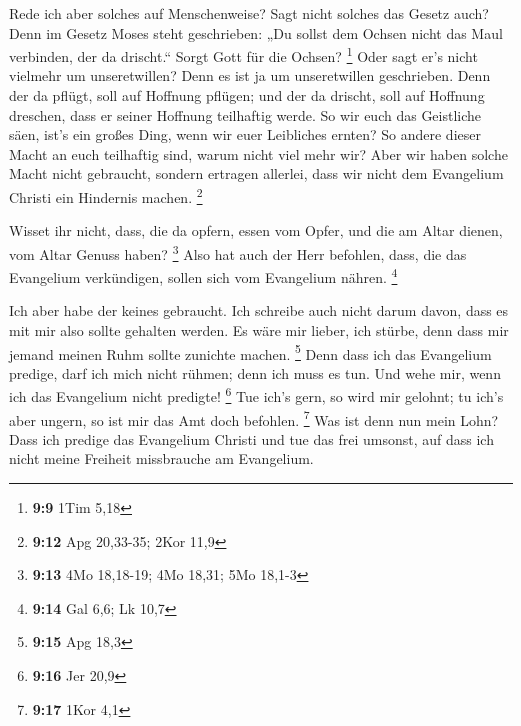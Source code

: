  Rede ich aber solches auf Menschenweise? Sagt nicht solches
das Gesetz auch?  Denn im Gesetz Moses steht geschrieben:
„Du sollst dem Ochsen nicht das Maul verbinden, der da drischt.`` Sorgt
Gott für die Ochsen? \footnote{\textbf{9:9} 1Tim 5,18} 
Oder sagt er's nicht vielmehr um unseretwillen? Denn es ist ja um
unseretwillen geschrieben. Denn der da pflügt, soll auf Hoffnung
pflügen; und der da drischt, soll auf Hoffnung dreschen, dass er seiner
Hoffnung teilhaftig werde.  So wir euch das Geistliche
säen, ist's ein großes Ding, wenn wir euer Leibliches ernten?
 So andere dieser Macht an euch teilhaftig sind, warum
nicht viel mehr wir? Aber wir haben solche Macht nicht gebraucht,
sondern ertragen allerlei, dass wir nicht dem Evangelium Christi ein
Hindernis machen. \footnote{\textbf{9:12} Apg 20,33-35; 2Kor 11,9}

 Wisset ihr nicht, dass, die da opfern, essen vom Opfer,
und die am Altar dienen, vom Altar Genuss haben? \footnote{\textbf{9:13}
  4Mo 18,18-19; 4Mo 18,31; 5Mo 18,1-3}  Also hat auch der
Herr befohlen, dass, die das Evangelium verkündigen, sollen sich vom
Evangelium nähren. \footnote{\textbf{9:14} Gal 6,6; Lk 10,7}

 Ich aber habe der keines gebraucht. Ich schreibe auch
nicht darum davon, dass es mit mir also sollte gehalten werden. Es wäre
mir lieber, ich stürbe, denn dass mir jemand meinen Ruhm sollte zunichte
machen. \footnote{\textbf{9:15} Apg 18,3}  Denn dass ich
das Evangelium predige, darf ich mich nicht rühmen; denn ich muss es
tun. Und wehe mir, wenn ich das Evangelium nicht predigte! \footnote{\textbf{9:16}
  Jer 20,9}  Tue ich's gern, so wird mir gelohnt; tu ich's
aber ungern, so ist mir das Amt doch befohlen. \footnote{\textbf{9:17}
  1Kor 4,1}  Was ist denn nun mein Lohn? Dass ich predige
das Evangelium Christi und tue das frei umsonst, auf dass ich nicht
meine Freiheit missbrauche am Evangelium.


